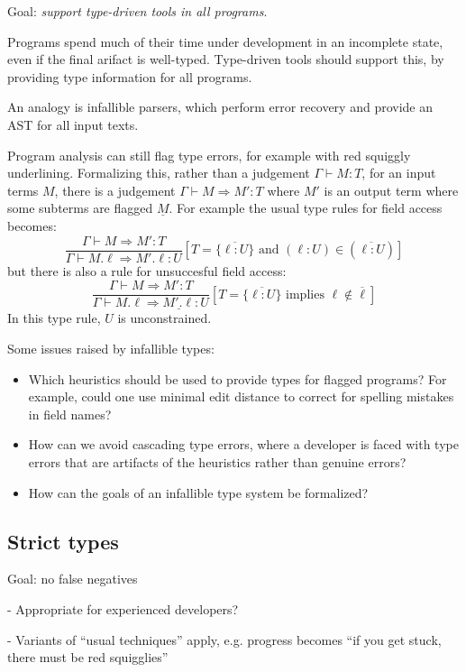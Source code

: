\documentclass[acmsmall]{acmart}
\newcommand{\squnder}[1]{\underline{#1}}
\newcommand{\infer}[2]{\frac{\textstyle#1}{\textstyle#2}}
\begin{document}
Goal: \emph{support type-driven tools in all programs}.

Programs spend much of their time under development in an incomplete state, even if the final arifact
is well-typed. Type-driven tools should support this, by providing type information for all programs.

An analogy is infallible parsers, which perform error recovery and provide an AST for all input texts.

Program analysis can still flag type errors, for example with red
squiggly underlining. Formalizing this, rather than a judgement
$\Gamma\vdash M:T$, for an input terms $M$, there is a judgement
$\Gamma \vdash M \Rightarrow M' : T$ where $M'$ is an output term
where some subterms are flagged $\squnder{M}$. For example the usual type rules for field access becomes:
\[
  \infer{
    \Gamma \vdash M \Rightarrow M' : T
  }{
    \Gamma \vdash M.\ell \Rightarrow M'.\ell : U
  }
  [
    T = \{ \overline{\ell:U} \} \mbox{ and } (\ell:U) \in (\overline{\ell:U})
  ]
\]
but there is also a rule for unsuccesful field access:  
\[
  \infer{
    \Gamma \vdash M \Rightarrow M' : T
  }{
    \Gamma \vdash M.\ell \Rightarrow \squnder{M'.\ell} : U
  }
  [
    T = \{ \overline{\ell:U} \} \mbox{ implies } \ell \not\in \overline{\ell}
  ]
\]
In this type rule, $U$ is unconstrained.

Some issues raised by infallible types:
\begin{itemize}
\item Which heuristics should be used to provide types for flagged programs? For example, could one
  use minimal edit distance to correct for spelling mistakes in field names?
\item How can we avoid cascading type errors, where a developer is
  faced with type errors that are artifacts of the heuristics rather
  than genuine errors?
\item How can the goals of an infallible type system be formalized?
\end{itemize}

\subsection{Strict types}

Goal: no false negatives

- Appropriate for experienced developers?

- Variants of ``usual techniques'' apply, e.g. progress becomes ``if you get stuck, there must be red squigglies''
\end{document}
